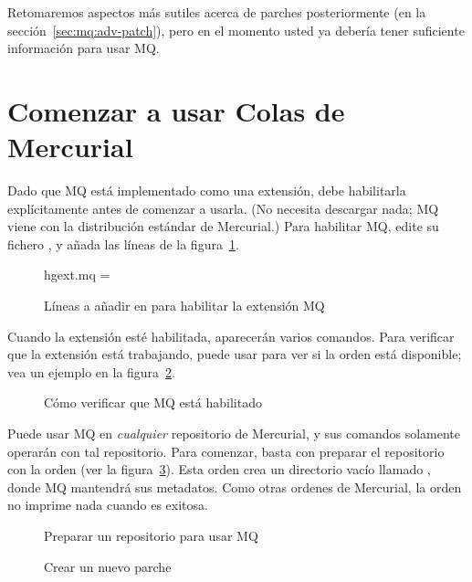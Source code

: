 Retomaremos aspectos más sutiles acerca de parches posteriormente (en
la sección~\ref{sec:mq:adv-patch}), pero en el momento usted ya
debería tener suficiente información para usar MQ.

\section{Comenzar a usar Colas de Mercurial}
\label{sec:mq:start}

Dado que MQ está implementado como una extensión, debe habilitarla
explícitamente antes de comenzar a usarla.  (No necesita descargar
nada; MQ viene con la distribución estándar de Mercurial.)  Para
habilitar MQ, edite su fichero , y añada las líneas
de la figura~\ref{ex:mq:config}.

\begin{figure}[ht]
  \begin{codesample4}
    [extensions]
    hgext.mq =
  \end{codesample4}
  \label{ex:mq:config}
  \caption{Líneas a añadir en  para habilitar la extensión MQ}
\end{figure}

Cuando la extensión esté habilitada, aparecerán varios comandos.  Para
verificar que la extensión está trabajando, puede usar 
para ver si la orden  está disponible; vea un
ejemplo en la figura~\ref{ex:mq:enabled}.

\begin{figure}[ht]
  \caption{Cómo verificar que MQ está habilitado}
  \label{ex:mq:enabled}
\end{figure}

Puede usar MQ en \emph{cualquier} repositorio de Mercurial, y sus
comandos solamente operarán con tal repositorio.  Para comenzar, basta
con preparar el repositorio con la orden  (ver la
figura~\ref{ex:mq:qinit}).  Esta orden crea un directorio vacío
llamado , donde MQ mantendrá sus metadatos. Como
otras ordenes de Mercurial, la orden  no imprime
nada cuando es exitosa.

\begin{figure}[ht]
  \caption{Preparar un repositorio para usar MQ}
  \label{ex:mq:qinit}
\end{figure}

\begin{figure}[ht]
  \caption{Crear un nuevo parche}
  \label{ex:mq:qnew}
\end{figure}

